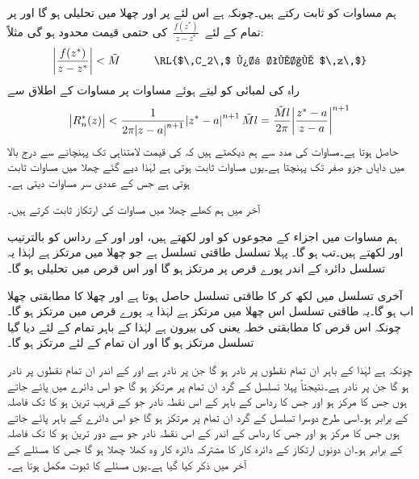 ہم مساوات  کو ثابت رکتے ہیں۔چونکہ  ہے اس لئے  پر اور چھلا میں  تحلیلی ہو گا اور   پر تمام  کے لئے 
$\,\tfrac{f(z^*)}{z-z^*}\,$
کی حتمی قیمت محدود ہو گی مثلاً:
\begin{align*}
\abs{\frac{f(z^*)}{z-z^*}}<\tilde{M}\quad \quad \quad \text{\RL{$\,C_2\,$ پر تمام $\,z\,$}}
\end{align*}
راہ  کی لمبائی کو  لیتے ہوئے  مساوات  پر مساوات  کے اطلاق سے
\begin{align*}
\abs{R^*_n(z)}<\frac{1}{2\pi\abs{z-a}^{n+1}}\abs{z^*-a}^{n+1}\tilde{M} l=\frac{\tilde{M}l}{2\pi}\abs{\frac{z^*-a}{z-a}}^{n+1}
\end{align*}
حاصل ہوتا ہے۔مساوات  کی مدد سے ہم دیکھتے ہیں کہ  کی قیمت لامتناہی تک پہنچانے سے درج بالا میں دایاں جزو صفر تک پہنچتا ہے۔یوں مساوات  ثابت ہوتی ہے لہٰذا دیے گئے چھلا میں مساوات  ثابت ہوتی ہے جس کے عددی سر مساوات  دیتی ہے۔

آخر میں ہم کھلے چھلا میں مساوات  کی ارتکاز ثابت کرتے ہیں۔

ہم مساوات  میں  اجزاء کے مجوعوں کو  اور  لکھتے ہیں، اور  اور  کے رداس کو بالترتیب  اور  لکھتے ہیں۔تب  ہو گا۔ پہلا تسلسل طاقتی تسلسل ہے جو  چھلا میں مرتکز ہے  لہٰذا یہ تسلسل دائرہ  کے اندر پورے قرص پر مرتکز ہو گا اور  اس قرص میں تحلیلی ہو گا۔

آخری تسلسل میں  لکھ کر  کا طاقتی تسلسل حاصل ہوتا ہے اور چھلا  کا مطابقتی چھلا اب
  ہو گا۔یہ طاقتی تسلسل اس چھلا میں مرتکز ہے لہٰذا یہ پورے قرص  میں مرتکز ہو گا۔چونکہ اس  قرص کا مطابقتی خطہ  یعنی  کی بیرون ہے لہٰذا  کے باہر تمام  کے لئے دیا گیا تسلسل مرتکز ہو گا اور  ان تمام  کے لئے مرتکز ہو گا۔

چونکہ  ہے لہٰذا  کے باہر ان تمام نقطوں پر  نادر ہو گا جن پر  نادر ہے اور  کے اندر ان تمام نقطوں پر  نادر ہو گا جن پر  نادر ہے۔نتیجتاً پہلا تسلسل  کے گرد ان تمام  پر مرتکز ہو گا جو  اس دائرے میں پائے جاتے ہوں جس کا مرکز  ہو اور جس کا رداس   کے باہر  کے اس نقطہ نادر جو  کے قریب ترین ہو کا  تک فاصلہ کے برابر ہو۔اسی طرح دوسرا تسلسل  کے گرد ان تمام  پر مرتکز ہو گا جو  اس دائرے کے باہر پائے جاتے ہوں جس کا مرکز  ہو اور جس کا رداس   کے اندر   کے اس نقطہ نادر جو  سے دور ترین ہو کا  تک فاصلہ کے برابر ہو۔ان دونوں  ارتکاز کے دائرہ کار کا مشترکہ دائرہ کار وہ کھلا چھلا ہو گا جس کا مسئلے کے آخر  میں ذکر کیا گیا ہے۔یوں مسئلے کا ثبوت مکمل ہوتا ہے۔  

